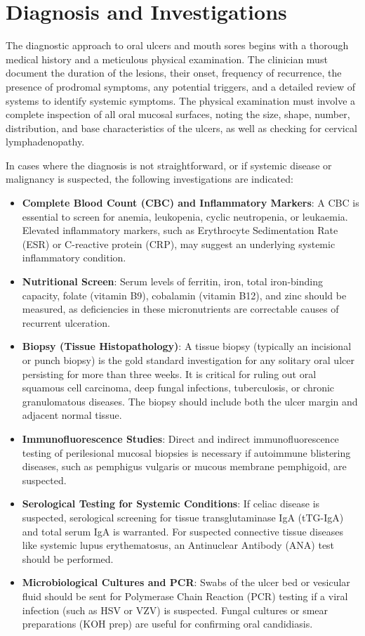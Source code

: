 \section*{Diagnosis and Investigations}
The diagnostic approach to oral ulcers and mouth sores begins with a thorough medical history and a meticulous physical examination. The clinician must document the duration of the lesions, their onset, frequency of recurrence, the presence of prodromal symptoms, any potential triggers, and a detailed review of systems to identify systemic symptoms. The physical examination must involve a complete inspection of all oral mucosal surfaces, noting the size, shape, number, distribution, and base characteristics of the ulcers, as well as checking for cervical lymphadenopathy.

In cases where the diagnosis is not straightforward, or if systemic disease or malignancy is suspected, the following investigations are indicated:
\begin{itemize}
    \item \textbf{Complete Blood Count (CBC) and Inflammatory Markers}: A CBC is essential to screen for anemia, leukopenia, cyclic neutropenia, or leukaemia. Elevated inflammatory markers, such as Erythrocyte Sedimentation Rate (ESR) or C-reactive protein (CRP), may suggest an underlying systemic inflammatory condition.
    \item \textbf{Nutritional Screen}: Serum levels of ferritin, iron, total iron-binding capacity, folate (vitamin B9), cobalamin (vitamin B12), and zinc should be measured, as deficiencies in these micronutrients are correctable causes of recurrent ulceration.
    \item \textbf{Biopsy (Tissue Histopathology)}: A tissue biopsy (typically an incisional or punch biopsy) is the gold standard investigation for any solitary oral ulcer persisting for more than three weeks. It is critical for ruling out oral squamous cell carcinoma, deep fungal infections, tuberculosis, or chronic granulomatous diseases. The biopsy should include both the ulcer margin and adjacent normal tissue.
    \item \textbf{Immunofluorescence Studies}: Direct and indirect immunofluorescence testing of perilesional mucosal biopsies is necessary if autoimmune blistering diseases, such as pemphigus vulgaris or mucous membrane pemphigoid, are suspected.
    \item \textbf{Serological Testing for Systemic Conditions}: If celiac disease is suspected, serological screening for tissue transglutaminase IgA (tTG-IgA) and total serum IgA is warranted. For suspected connective tissue diseases like systemic lupus erythematosus, an Antinuclear Antibody (ANA) test should be performed.
    \item \textbf{Microbiological Cultures and PCR}: Swabs of the ulcer bed or vesicular fluid should be sent for Polymerase Chain Reaction (PCR) testing if a viral infection (such as HSV or VZV) is suspected. Fungal cultures or smear preparations (KOH prep) are useful for confirming oral candidiasis.
\end{itemize}

